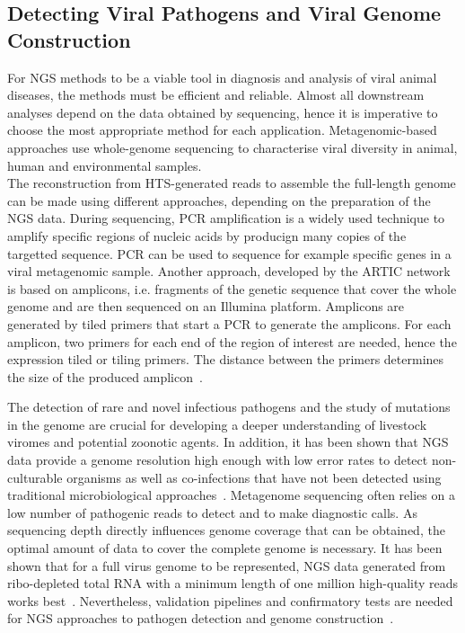 \subsection{Detecting Viral Pathogens and Viral Genome Construction}
For \ac{NGS} methods to be a viable tool in diagnosis and analysis of viral animal diseases, the methods must be efficient and reliable. Almost all downstream analyses depend on the data obtained by sequencing, hence it is imperative to choose the most appropriate method for each application. Metagenomic-based approaches use whole-genome sequencing to characterise viral diversity in animal, human and environmental samples. \\
The reconstruction from \ac{HTS}-generated reads to assemble the full-length genome can be made using different approaches, depending on the preparation of the \ac{NGS} data. During sequencing, \ac{PCR} amplification is a widely used technique to amplify specific regions of nucleic acids by producign many copies of the targetted sequence. \ac{PCR} can be used to sequence for example specific genes in a viral metagenomic sample. Another approach, developed by the ARTIC network is based on amplicons, i.e. fragments of the genetic sequence that cover the whole genome and are then sequenced on an Illumina platform. Amplicons are generated by tiled primers that start a \ac{PCR} to generate the amplicons. For each amplicon, two primers for each end of the region of interest are needed, hence the expression tiled or tiling primers. The distance between the primers determines the size of the produced amplicon~.

The detection of rare and novel infectious pathogens and the study of mutations in the genome are crucial for developing a deeper understanding of livestock viromes and potential zoonotic agents. In addition, it has been shown that \ac{NGS} data provide a genome resolution high enough with low error rates to detect non-culturable organisms as well as co-infections that have not been detected using traditional microbiological approaches~\cite{cantalupo2019detecting}. Metagenome sequencing often relies on a low number of pathogenic reads to detect and to make diagnostic calls. As sequencing depth directly influences genome coverage that can be obtained, the optimal amount of data to cover the complete genome is necessary. It has been shown that for a full virus genome to be represented, \ac{NGS} data generated from ribo-depleted total \ac{RNA} with a minimum length of one million high-quality reads works best~\cite{visser2016next}. Nevertheless, validation pipelines and confirmatory tests are needed for \ac{NGS} approaches to pathogen detection and genome construction~\cite{minogue2019next}. 

